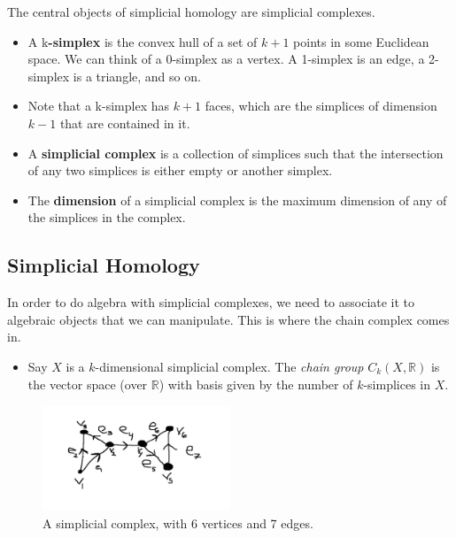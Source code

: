 \documentclass[12pt]{article}
\begin{document}
The central objects of simplicial homology are simplicial complexes.

\begin{itemize}

\item A k\textbf{-simplex} is the convex hull of a set of $k+1$ points in some Euclidean space. We can think of a 0-simplex as a
  vertex. A 1-simplex is an edge, a 2-simplex is a triangle, and so on. 

\item Note that a k-simplex has $k+1$ faces, which are the simplices of dimension $k-1$ that are
  contained in it.

\item A \textbf{simplicial complex} is a collection of simplices such that the intersection of any two simplices is either empty or
another simplex.

\item The \textbf{dimension} of a simplicial complex is the maximum dimension of any of the simplices in the complex. 

\end{itemize}

\subsection{Simplicial Homology}

In order to do algebra with simplicial complexes, we need to associate it to algebraic objects that
we can manipulate. This is where the chain complex comes in.

\begin{itemize}

  \item Say $X$ is a $k$-dimensional simplicial complex. The \textit{chain group} $C_k(X,
    \mathbb{R})$ is the vector space (over $\mathbb{R}$) with basis given by the number of
    $k$-simplices in $X$. 

\end{itemize}

\begin{figure}[ht]
  \begin{center}
      \includegraphics[width=0.5\textwidth]{Simp_Cx.jpg}
  \end{center}
\caption{A simplicial complex, with 6 vertices and 7 edges.}
\end{figure}
\end{document}
